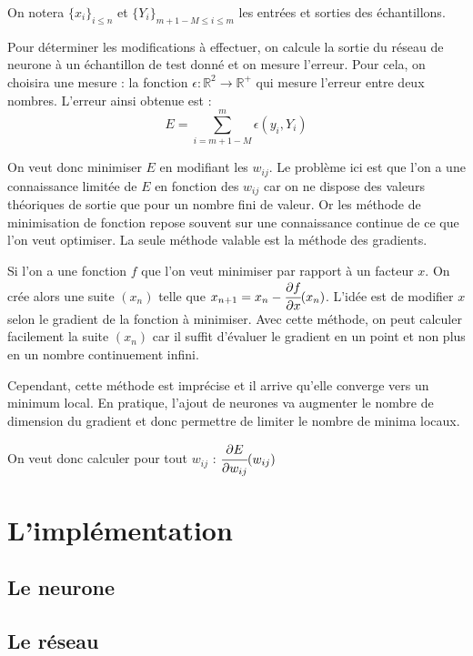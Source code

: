 \medskip

On notera $\{x_i\}_{i \leq n}$ et $\{Y_i\}_{m+1-M \leq i \leq m}$
les entrées et sorties des échantillons.

\medskip

Pour déterminer les modifications à effectuer, on calcule la sortie du réseau
de neurone à un échantillon de test donné et on mesure l'erreur.
Pour cela, on choisira une mesure :
la fonction $\epsilon : \mathbb{R}^2 \to \mathbb{R}^{+}$ qui mesure l'erreur
entre deux nombres. L'erreur ainsi obtenue est :
\[ E = \sum_{i = m+1-M}^m \epsilon(y_i, Y_i)\]

On veut donc minimiser $E$ en modifiant les $w_{ij}$. Le problème ici est que
l'on a une connaissance limitée de $E$ en fonction des $w_{ij}$ car on ne dispose des
valeurs théoriques de sortie que pour un nombre fini de valeur. Or les méthode de
minimisation de fonction repose souvent sur une connaissance continue de ce
que l'on veut optimiser. La seule méthode valable est la méthode des gradients.

\medskip

Si l'on a une fonction $f$ que l'on veut minimiser par rapport à un facteur $x$.
On crée alors une suite $(x_n)$ telle que
$x_{n+1} = x_{n} - \cfrac{\partial f}{\partial x}(x_n)$.
L'idée est de modifier $x$ selon le gradient de la fonction à minimiser. Avec
cette méthode, on peut calculer facilement la suite $(x_n)$ car il suffit
d'évaluer le gradient en un point et non plus en un nombre
continuement infini.

\medskip

Cependant, cette méthode est imprécise et il arrive
qu'elle converge vers un minimum local. En pratique, l'ajout de
neurones va augmenter le nombre de dimension du gradient et donc permettre de
limiter le nombre de minima locaux.

\medskip

On veut donc calculer pour tout $w_{ij}$ : $\cfrac{\partial E}{\partial w_{ij}}(w_{ij})$



\section{L'implémentation}

\subsection{Le neurone}

\subsection{Le réseau}

